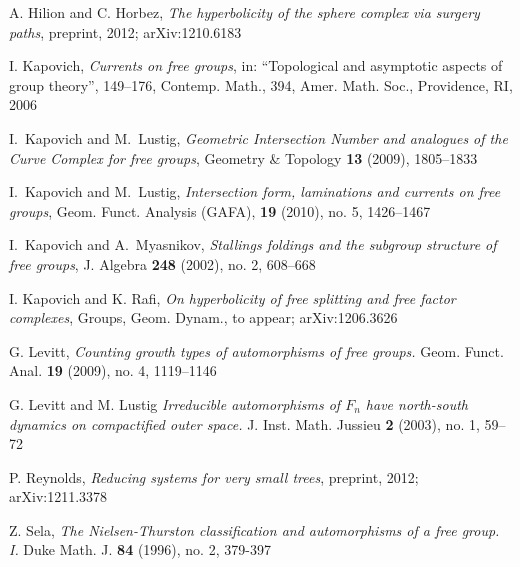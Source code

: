 \documentclass[10pt]{amsart}
\newcommand\<{\langle}
\renewcommand\>{\rangle}
\theoremstyle{definition}
\begin{document}
\begin{thebibliography}{ABC}
A. Hilion and C. Horbez,
\emph{The hyperbolicity of the sphere complex via surgery paths},
preprint, 2012;  arXiv:1210.6183 

I. Kapovich, \emph{Currents on free groups}, in: ``Topological and asymptotic aspects of group theory'', 149--176, Contemp. Math., 394, Amer. Math. Soc., Providence, RI, 2006

I.~Kapovich and M.~Lustig, \emph{Geometric Intersection Number and analogues of the Curve Complex for free
groups}, Geometry \& Topology \textbf{13} (2009),  1805--1833


I.~Kapovich and M.~Lustig, \emph{Intersection form, laminations and
currents on free groups}, Geom. Funct. Analysis (GAFA), \textbf{19} (2010), no. 5, 1426--1467

I.~Kapovich and A.~Myasnikov, \emph{Stallings foldings and the
subgroup structure of free groups}, J. Algebra \textbf{248} (2002), no. 2, 608--668

I. Kapovich and K. Rafi,
\emph{On hyperbolicity of free splitting and free factor complexes}, Groups, Geom. Dynam.,  to appear;  arXiv:1206.3626 

G. Levitt, \emph{Counting growth types of automorphisms of free groups.} Geom. Funct. Anal. \textbf{19} (2009), no. 4, 1119--1146

G. Levitt and M. Lustig
\emph{Irreducible automorphisms of $F_n$ have north-south dynamics on compactified outer space.} J. Inst. Math. Jussieu \textbf{2} (2003), no. 1, 59--72


P. Reynolds, \emph{Reducing systems for very small trees}, preprint, 2012; arXiv:1211.3378 


Z. Sela, \emph{The Nielsen-Thurston classification and automorphisms of a free group. I.} Duke Math. J. \textbf{84} (1996), no. 2, 379-397




\end{thebibliography}	

	
\end{document}

